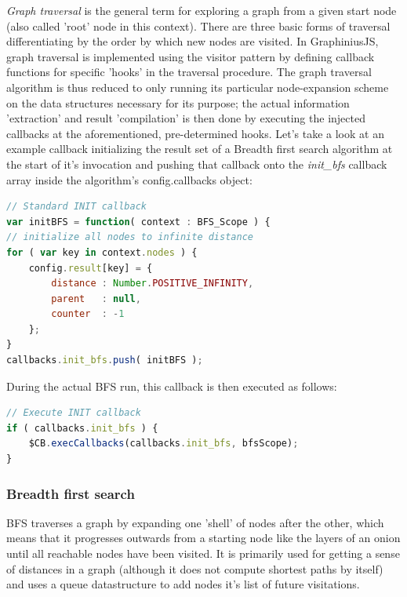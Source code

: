 		\textit{Graph traversal} is the general term for exploring a graph from a given start node (also called 'root' node in this context). There are three basic forms of traversal differentiating by the order by which new nodes are visited. In GraphiniusJS, graph traversal is implemented using the visitor pattern by defining callback functions for specific 'hooks' in the traversal procedure. The graph traversal algorithm is thus reduced to only running its particular node-expansion scheme on the data structures necessary for its purpose; the actual information 'extraction' and result 'compilation' is then done by executing the injected callbacks at the aforementioned, pre-determined hooks. Let's take a look at an example callback initializing the result set of a Breadth first search algorithm at the start of it's invocation and pushing that callback onto the \textit{init\_bfs} callback array inside the algorithm's config.callbacks object:
		
		\begin{lstlisting}[caption={Defining a callback function for traversal.}, label={lst:traversal_cb}, language=JavaScript]
// Standard INIT callback
var initBFS = function( context : BFS_Scope ) {
// initialize all nodes to infinite distance
for ( var key in context.nodes ) {
	config.result[key] = {
		distance : Number.POSITIVE_INFINITY,
		parent 	 : null,
		counter	 : -1
	};
}
callbacks.init_bfs.push( initBFS );
		\end{lstlisting}
		
		During the actual BFS run, this callback is then executed as follows:
		
		\begin{lstlisting}[caption={Executing a callback function during traversal.}, label={lst:traversal_cb_exec}, language=JavaScript]
// Execute INIT callback
if ( callbacks.init_bfs ) {
	$CB.execCallbacks(callbacks.init_bfs, bfsScope);
}
		\end{lstlisting}

	
		\subsubsection{Breadth first search}
		\label{sssect:search_bfs}
		
		BFS traverses a graph by expanding one 'shell' of nodes after the other, which means that it progresses outwards from a starting node like the layers of an onion until all reachable nodes have been visited. It is primarily used for getting a sense of distances in a graph (although it does not compute shortest paths by itself) and uses a queue datastructure to add nodes it's list of future visitations.
		
